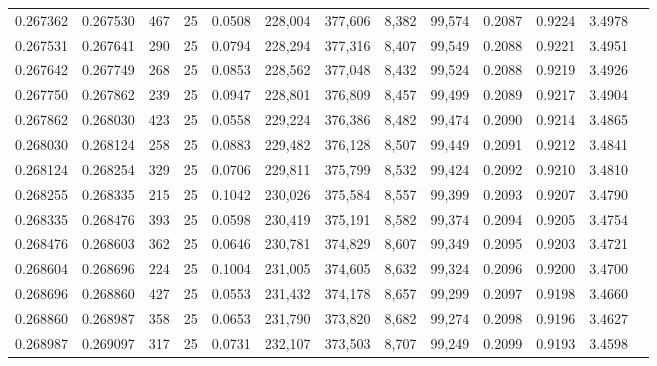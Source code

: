 \begin{tabular}{rrrrrrrrrrrrr}
0.267362 & 0.267530 &   467 &  25 &                                     0.0508 & 228,004 & 377,606 &   8,382 &  99,574 & 0.2087 & 0.9224 & 3.4978 \\
0.267531 & 0.267641 &   290 &  25 &                                     0.0794 & 228,294 & 377,316 &   8,407 &  99,549 & 0.2088 & 0.9221 & 3.4951 \\
0.267642 & 0.267749 &   268 &  25 &                                     0.0853 & 228,562 & 377,048 &   8,432 &  99,524 & 0.2088 & 0.9219 & 3.4926 \\
0.267750 & 0.267862 &   239 &  25 &                                     0.0947 & 228,801 & 376,809 &   8,457 &  99,499 & 0.2089 & 0.9217 & 3.4904 \\
0.267862 & 0.268030 &   423 &  25 &                                     0.0558 & 229,224 & 376,386 &   8,482 &  99,474 & 0.2090 & 0.9214 & 3.4865 \\
0.268030 & 0.268124 &   258 &  25 &                                     0.0883 & 229,482 & 376,128 &   8,507 &  99,449 & 0.2091 & 0.9212 & 3.4841 \\
0.268124 & 0.268254 &   329 &  25 &                                     0.0706 & 229,811 & 375,799 &   8,532 &  99,424 & 0.2092 & 0.9210 & 3.4810 \\
0.268255 & 0.268335 &   215 &  25 &                                     0.1042 & 230,026 & 375,584 &   8,557 &  99,399 & 0.2093 & 0.9207 & 3.4790 \\
0.268335 & 0.268476 &   393 &  25 &                                     0.0598 & 230,419 & 375,191 &   8,582 &  99,374 & 0.2094 & 0.9205 & 3.4754 \\
0.268476 & 0.268603 &   362 &  25 &                                     0.0646 & 230,781 & 374,829 &   8,607 &  99,349 & 0.2095 & 0.9203 & 3.4721 \\
0.268604 & 0.268696 &   224 &  25 &                                     0.1004 & 231,005 & 374,605 &   8,632 &  99,324 & 0.2096 & 0.9200 & 3.4700 \\
0.268696 & 0.268860 &   427 &  25 &                                     0.0553 & 231,432 & 374,178 &   8,657 &  99,299 & 0.2097 & 0.9198 & 3.4660 \\
0.268860 & 0.268987 &   358 &  25 &                                     0.0653 & 231,790 & 373,820 &   8,682 &  99,274 & 0.2098 & 0.9196 & 3.4627 \\
0.268987 & 0.269097 &   317 &  25 &                                     0.0731 & 232,107 & 373,503 &   8,707 &  99,249 & 0.2099 & 0.9193 & 3.4598 \\

\end{tabular}
